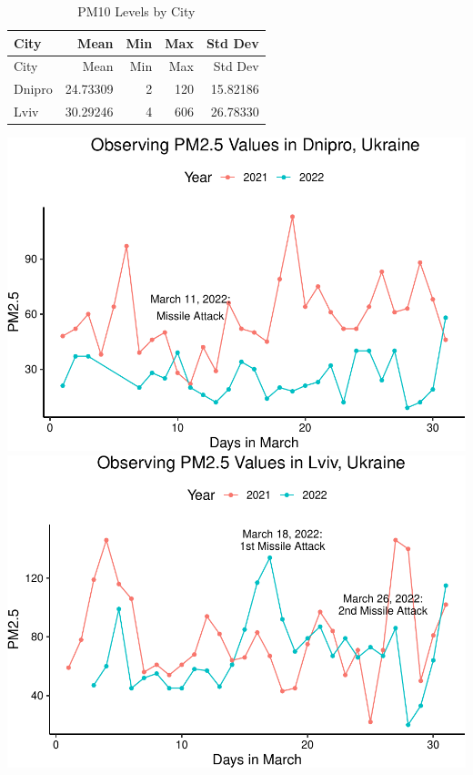 \documentclass[
  12pt,
]{article}
\begin{document}
\begin{longtable}[]{@{}lrrrr@{}}
\caption{PM10 Levels by City}\tabularnewline
\toprule
City & Mean & Min & Max & Std Dev \\
\midrule
\endfirsthead
\toprule
City & Mean & Min & Max & Std Dev \\
\midrule
\endhead
Dnipro & 24.73309 & 2 & 120 & 15.82186 \\
Lviv & 30.29246 & 4 & 606 & 26.78330 \\
\bottomrule
\end{longtable}

\includegraphics{Fontanie_Gordon_Weinberg_Project_files/figure-latex/Plotting.PM25-1.pdf}
\includegraphics{Fontanie_Gordon_Weinberg_Project_files/figure-latex/Plotting.PM25-2.pdf}
\end{document}
